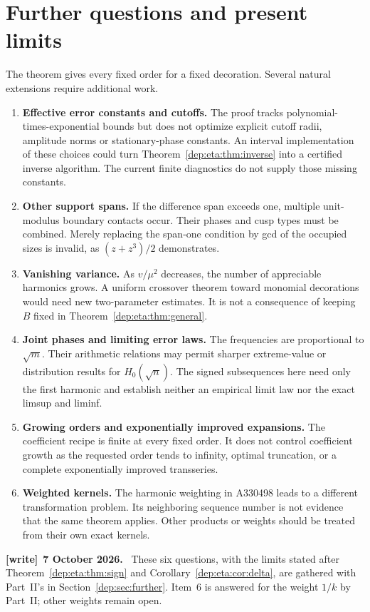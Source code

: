 \documentclass[11pt]{article}
\theoremstyle{definition}\newtheorem{definition}[theorem]{Definition}
\theoremstyle{remark}\newtheorem{remark}[theorem]{Remark}
\newenvironment{writenote}[1][]{\par\smallskip\begingroup\small
 \noindent\textbf{[write]}\if\relax\detokenize{#1}\relax\else~\textbf{#1.}\fi\ }%
 {\par\endgroup\smallskip}
\begin{document}
\section{Further questions and present limits}\label{dep:eta:sec:further}
The theorem gives every fixed order for a fixed decoration. Several
natural extensions require additional work.
\begin{enumerate}
\item \textbf{Effective error constants and cutoffs.}
The proof tracks polynomial-times-exponential bounds but does not
optimize explicit cutoff radii, amplitude norms or stationary-phase
constants. An interval implementation of these choices could turn
Theorem~\ref{dep:eta:thm:inverse} into a certified inverse algorithm. The
current finite diagnostics do not supply those missing constants.
\item \textbf{Other support spans.}
If the difference span exceeds one, multiple unit-modulus boundary
contacts occur. Their phases and cusp types must be combined. Merely
replacing the span-one condition by gcd of the occupied sizes is
invalid, as $(z+z^3)/2$ demonstrates.
\item \textbf{Vanishing variance.}
As $v/\mu^2$ decreases, the number of appreciable harmonics grows.
A uniform crossover theorem toward monomial decorations would need
new two-parameter estimates. It is not a consequence of keeping
$B$ fixed in Theorem~\ref{dep:eta:thm:general}.
\item \textbf{Joint phases and limiting error laws.}
The frequencies are proportional to $\sqrt m$. Their arithmetic
relations may permit sharper extreme-value or distribution results
for $H_0(\sqrt n)$. The signed subsequences here need only the first
harmonic and establish neither an empirical limit law nor the exact
limsup and liminf.
\item \textbf{Growing orders and exponentially improved expansions.}
The coefficient recipe is finite at every fixed order. It does not
control coefficient growth as the requested order tends to infinity,
optimal truncation, or a complete exponentially improved transseries.
\item \textbf{Weighted kernels.}
The harmonic weighting in A330498 leads to a different transformation
problem. Its neighboring sequence number is not evidence that the
same theorem applies. Other products or weights should be treated
from their own exact kernels.
\end{enumerate}

\begin{writenote}[7 October 2026]
These six questions, with the limits stated after Theorem~\ref{dep:eta:thm:sign} and Corollary~\ref{dep:eta:cor:delta}, are gathered with Part~II's in Section~\ref{dep:sec:further}. Item~6 is answered for the weight $1/k$ by Part~II; other weights remain open.
\end{writenote}
\end{document}
